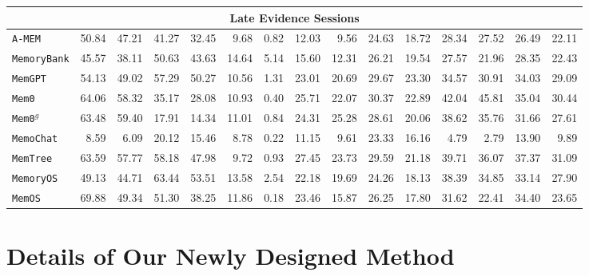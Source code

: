 \begin{table}[]
\begin{tabular}{l|r|r|r|r|r|r|r|r|r|r|r|r|r|r}
 \multicolumn{15}{c}{Late Evidence Sessions}\\ \midrule
{\tt A-MEM} & 50.84 & 47.21 & 41.27 & 32.45 & 9.68 & 0.82 & 12.03 & 9.56 & 24.63 & 18.72 & 28.34 & 27.52 &26.49 &22.11 \\
{\tt MemoryBank} & 45.57 & 38.11 & 50.63 & 43.63 & 14.64 & 5.14 & 15.60 & 12.31 & 26.21 & 19.54 & 27.57 & 21.96 &28.35 &22.43 \\
{\tt MemGPT} & 54.13& 49.02& 57.29& 50.27& 10.56& 1.31& 23.01& 20.69& 29.67& 23.30& 34.57& 30.91 &34.03 &29.09\\
{\tt Mem0}& 64.06 & 58.32 & 35.17 & 28.08 & 10.93 & 0.40 & 25.71 & 22.07 & 30.37 & 22.89 & 42.04 & 45.81 &35.04 &30.44 \\
{\tt Mem0$^g$} & 63.48 & 59.40 & 17.91 & 14.34 & 11.01 & 0.84 & 24.31 & 25.28 & 28.61 & 20.06 & 38.62 & 35.76 &31.66 &27.61 \\
{\tt MemoChat} &8.59 &6.09 &20.12 &15.46 &8.78 &0.22 &11.15 &9.61 &23.33 &16.16 &4.79 &2.79 &13.90 &9.89 \\ 
{\tt MemTree} &63.59 &57.77 &58.18 &47.98 &9.72 &0.93 &27.45 &23.73 &29.59 &21.18 &39.71 &36.07 &37.37 &31.09 \\ 
{\tt MemoryOS} &49.13 &44.71 &63.44 &53.51 &13.58 &2.54 &22.18 &19.69 &24.26 &18.13 &38.39 &34.85 &33.14 &27.90 \\ 
{\tt MemOS} &69.88 &49.34 &51.30 &38.25 &11.86 &0.18 &23.46 &15.87 &26.25 &17.80 &31.62 &22.41 &34.40 &23.65\\
\bottomrule
\end{tabular}
\label{tab:lmepos}
\end{table}








\section{Details of Our Newly Designed Method}
\label{sec:app:ours}

